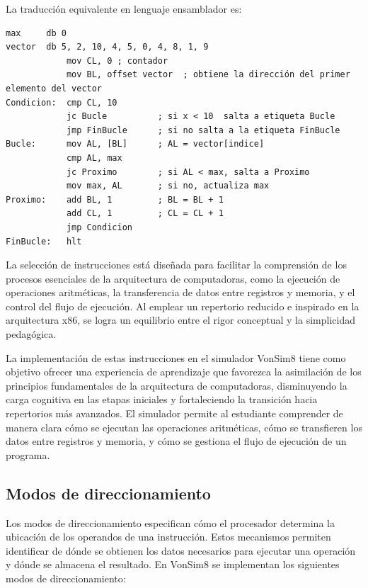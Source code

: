 \documentclass[12pt,oneside]{templates/unerthesis}
\begin{document}
La traducción equivalente en lenguaje ensamblador es:

\begin{lstlisting}
max     db 0
vector  db 5, 2, 10, 4, 5, 0, 4, 8, 1, 9
            mov CL, 0 ; contador
            mov BL, offset vector  ; obtiene la dirección del primer elemento del vector
Condicion:  cmp CL, 10 
            jc Bucle          ; si x < 10  salta a etiqueta Bucle
            jmp FinBucle      ; si no salta a la etiqueta FinBucle
Bucle:      mov AL, [BL]      ; AL = vector[indice] 
            cmp AL, max
            jc Proximo        ; si AL < max, salta a Proximo
            mov max, AL       ; si no, actualiza max
Proximo:    add BL, 1         ; BL = BL + 1 
            add CL, 1         ; CL = CL + 1            
            jmp Condicion 
FinBucle:   hlt
\end{lstlisting}

La selección de instrucciones está diseñada para facilitar la comprensión de los procesos esenciales de la arquitectura de computadoras, como la ejecución de operaciones aritméticas, la transferencia de datos entre registros y memoria, y el control del flujo de ejecución. Al emplear un repertorio reducido e inspirado en la arquitectura x86, se logra un equilibrio entre el rigor conceptual y la simplicidad pedagógica.

La implementación de estas instrucciones en el simulador VonSim8 tiene como objetivo ofrecer una experiencia de aprendizaje que favorezca la asimilación de los principios fundamentales de la arquitectura de computadoras, disminuyendo la carga cognitiva en las etapas iniciales y fortaleciendo la transición hacia repertorios más avanzados. El simulador permite al estudiante comprender de manera clara cómo se ejecutan las operaciones aritméticas, cómo se transfieren los datos entre registros y memoria, y cómo se gestiona el flujo de ejecución de un programa.

\hypertarget{modos-de-direccionamiento-1}{%
\subsection{Modos de direccionamiento}\label{modos-de-direccionamiento-1}}

Los modos de direccionamiento especifican cómo el procesador determina la ubicación de los operandos de una instrucción. Estos mecanismos permiten identificar de dónde se obtienen los datos necesarios para ejecutar una operación y dónde se almacena el resultado. En VonSim8 se implementan los siguientes modos de direccionamiento:
\end{document}
